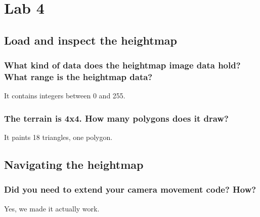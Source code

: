 \documentclass[a4paper,12pt]{article}
\begin{document}
\section{Lab 4}
\subsection{Load and inspect the heightmap}
\subsubsection{What kind of data does the heightmap image data hold? What range is the heightmap data?}
It contains integers between 0 and 255.

\subsubsection{The terrain is 4x4. How many polygons does it draw?}
It paints 18 triangles, one polygon.


\subsection{Navigating the heightmap}
\subsubsection{Did you need to extend your camera movement code? How?}
Yes, we made it actually work.
\end{document}
